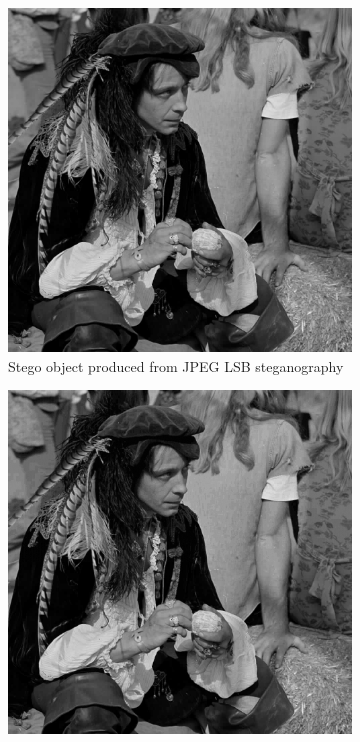 \documentclass{l4proj}
\begin{document}
\begin{figure}
    \centering
    \begin{subfigure}[b]{0.3\textwidth}
        \includegraphics[width=\textwidth]{images/jpeg_steganography_LSB.jpeg}
        \caption{Stego object produced from JPEG LSB steganography}
        \label{fig:jpeg_steg_LSB}
    \end{subfigure}
    \begin{subfigure}[b]{0.3\textwidth}
       \includegraphics[width=\textwidth]{images/jpeg_steganography_TLSB.jpeg}

\end{subfigure}
\end{figure}
\end{document}
